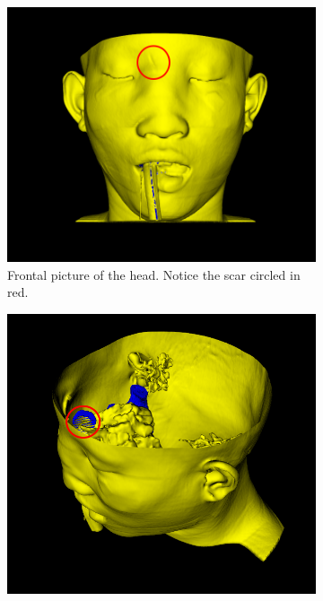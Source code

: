 \documentclass{article}
\begin{document}
\begin{figure}[h]
	\centering
	\begin{subfigure}[b]{0.3\textwidth}
		\includegraphics[width=\textwidth]{skull0}
			\caption{Frontal picture of the head. Notice the scar circled in
			red.}
			\label{fig:skull0}
	\end{subfigure}
	\quad
	\begin{subfigure}[b]{0.3\textwidth}
		\includegraphics[width=\textwidth]{skull1}

\end{subfigure}
\end{figure}
\end{document}
